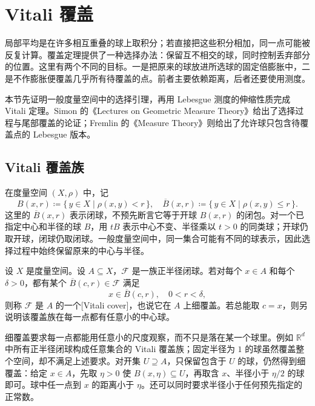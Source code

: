 \section{Vitali 覆盖}
\label{b1:sec:1301}

局部平均是在许多相互重叠的球上取积分；若直接把这些积分相加，同一点可能被反复计算。覆盖定理提供了一种选择办法：保留互不相交的球，同时控制丢弃部分的位置。这里有两个不同的目标。一是把原来的球放进所选球的固定倍膨胀中，二是不作膨胀便覆盖几乎所有待覆盖的点。前者主要依赖距离，后者还要使用测度。

\ProseParagraphBreak

本节先证明一般度量空间中的选择引理，再用 Lebesgue 测度的伸缩性质完成 Vitali 定理。Simon 的《Lectures on Geometric Measure Theory》\cite[\S3]{Simon1983Lectures}给出了选择过程与尾部覆盖的论证；Fremlin 的《Measure Theory》\cite[261B]{Fremlin2016Measure}则给出了允许球只包含待覆盖点的 Lebesgue 版本。

\subsection{Vitali 覆盖族}
\label{b1:subsec:130101}

在度量空间 \((X,\rho)\) 中，记
\[
B(x,r)\coloneqq\{\,y\in X\mid \rho(x,y)<r\,\},
\quad
\overline B(x,r)\coloneqq\{\,y\in X\mid \rho(x,y)\leq r\,\}.
\]
这里的 \(\overline B(x,r)\) 表示闭球，不预先断言它等于开球 \(B(x,r)\) 的闭包。对一个已指定中心和半径的球 \(B\)，用 \(tB\) 表示中心不变、半径乘以 \(t>0\) 的同类球；开球仍取开球，闭球仍取闭球。一般度量空间中，同一集合可能有不同的球表示，因此选择过程中始终保留原来的中心与半径。

\begin{definition}
\label{b1:def:vitali-cover}
设 \(X\) 是度量空间。设 \(A\subseteq X\)，\(\mathcal F\) 是一族正半径闭球。若对每个 \(x\in A\) 和每个 \(\delta>0\)，都有某个 \(\overline B(c,r)\in\mathcal F\) 满足
\[
x\in\overline B(c,r),
\quad
0<r<\delta,
\]
则称 \(\mathcal F\) 是 \(A\) 的一个[Vitali cover]，也说它在 \(A\) 上细覆盖。若总能取 \(c=x\)，则另说明该覆盖族在每一点都有任意小的中心球。
\end{definition}

细覆盖要求每一点都能用任意小的尺度观察，而不只是落在某一个球里。例如 \(\mathbb R^d\) 中所有正半径闭球构成任意集合的 Vitali 覆盖族；固定半径为 \(1\) 的球虽然覆盖整个空间，却不满足上述要求。对开集 \(U\supseteq A\)，只保留包含于 \(U\) 的球，仍然得到细覆盖：给定 \(x\in A\)，先取 \(\eta>0\) 使 \(B(x,\eta)\subseteq U\)，再取含 \(x\)、半径小于 \(\eta/2\) 的球即可。球中任一点到 \(x\) 的距离小于 \(\eta\)。还可以同时要求半径小于任何预先指定的正常数。

